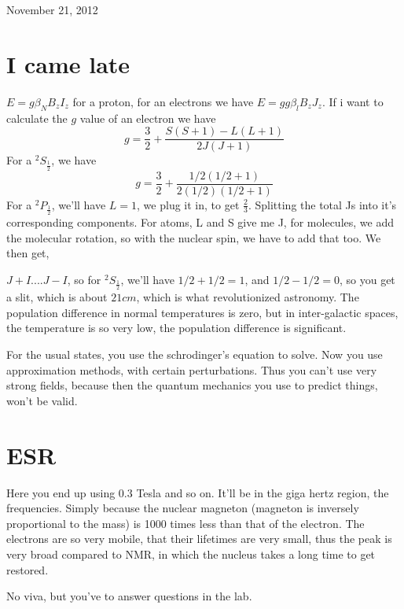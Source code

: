 \begin{flushright}
November 21, 2012
\end{flushright}
\section{I came late}
	$E=g\beta_NB_zI_z$ for a proton, for an electrons we have $E=gg\beta_lB_zJ_z$. If i want to calculate the $g$ value of an electron we have 
	\begin{equation}
		g=\frac{3}{2} + \frac{S(S+1)-L(L+1)}{2J(J+1)}
	\end{equation}
	For a $^2S_\frac{1}{2}$, we have 
	\begin{equation}
		g=\frac{3}{2} + \frac{1/2(1/2 + 1)}{2(1/2)(1/2 + 1)}
	\end{equation}
	For a $^2P_\frac{1}{2}$, we'll have $L=1$, we plug it in, to get $\frac{2}{3}$.
	Splitting the total Js into it's corresponding components. For atoms, L and S give me J, for molecules, we add the molecular rotation, so with the nuclear spin, we have to add that too.
	We then get,
	\par
		$J+I .... J-I$, so for $^2S_\frac{1}{2}$, we'll have $1/2 + 1/2 = 1$, and $1/2 - 1/2 = 0$, so you get a slit, which is about $21 cm$, which is what revolutionized astronomy. The population difference in normal temperatures is zero, but in inter-galactic spaces, the temperature is so very low, the population difference is significant.


	\par
	For the usual states, you use the schrodinger's equation to solve. Now you use approximation methods, with certain perturbations. Thus you can't use very strong fields, because then the quantum mechanics you use to predict things, won't be valid.

\section{ESR}
	Here you end up using 0.3 Tesla and so on. It'll be in the giga hertz region, the frequencies. Simply because the nuclear magneton (magneton is inversely proportional to the mass) is 1000 times less than that of the electron. The electrons are so very mobile, that their lifetimes are very small, thus the peak is very broad compared to NMR, in which the nucleus takes a long time to get restored.

	No viva, but you've to answer questions in the lab.